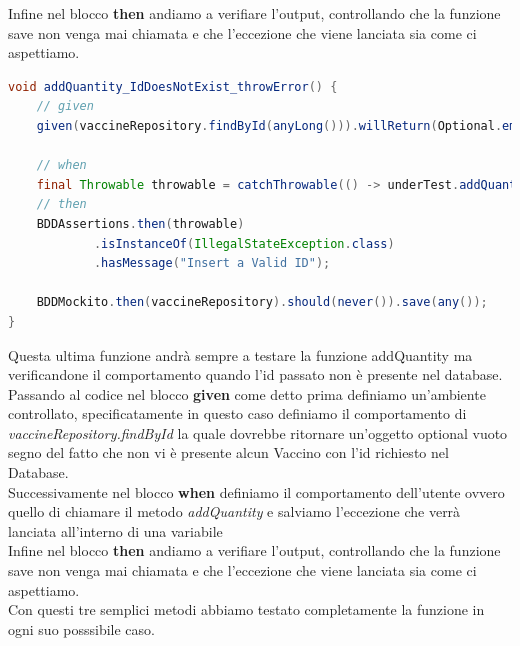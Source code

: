 \documentclass[a4paper,12pt,openany,oneside]{book}
\begin{document}
Infine nel blocco \textbf{then} andiamo a verifiare l'output, controllando che la funzione save non venga mai chiamata e che l'eccezione che viene lanciata sia come ci aspettiamo.\\
\begin{lstlisting}[language=Java]
void addQuantity_IdDoesNotExist_throwError() {
    // given
    given(vaccineRepository.findById(anyLong())).willReturn(Optional.empty());

    // when
    final Throwable throwable = catchThrowable(() -> underTest.addQuantity(vaccine.getVaccineID(), 50L));
    // then
    BDDAssertions.then(throwable)
            .isInstanceOf(IllegalStateException.class)
            .hasMessage("Insert a Valid ID");

    BDDMockito.then(vaccineRepository).should(never()).save(any());
}
\end{lstlisting}
Questa ultima funzione andrà sempre a testare la funzione addQuantity ma verificandone il comportamento quando l'id passato non è presente nel database.\\
Passando al codice nel blocco \textbf{given} come detto prima definiamo un'ambiente controllato, specificatamente in questo caso definiamo il comportamento di \textit{vaccineRepository.findById} la quale dovrebbe ritornare un'oggetto optional vuoto segno del fatto che non vi è presente alcun Vaccino con l'id richiesto nel Database.\\
Successivamente nel blocco \textbf{when} definiamo il comportamento dell'utente ovvero quello di chiamare il metodo \textit{addQuantity} e salviamo l'eccezione che verrà lanciata all'interno di una variabile \\
Infine nel blocco \textbf{then} andiamo a verifiare l'output, controllando che la funzione save non venga mai chiamata e che l'eccezione che viene lanciata sia come ci aspettiamo.\\
Con questi tre semplici metodi abbiamo testato completamente la funzione in ogni suo posssibile caso.
\end{document}
